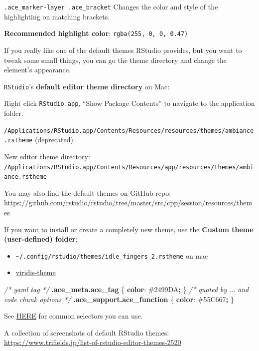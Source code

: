 \documentclass[
  a4paper,
  twoside,
  openright]{book}
\newenvironment{Shaded}{\begin{snugshade}}{\end{snugshade}}
\newcommand{\CharTok}[1]{\textcolor[rgb]{0.31,0.60,0.02}{#1}}
\newcommand{\CommentTok}[1]{\textcolor[rgb]{0.56,0.35,0.01}{\textit{#1}}}
\newcommand{\ConstantTok}[1]{\textcolor[rgb]{0.56,0.35,0.01}{#1}}
\newcommand{\FunctionTok}[1]{\textcolor[rgb]{0.13,0.29,0.53}{\textbf{#1}}}
\newcommand{\KeywordTok}[1]{\textcolor[rgb]{0.13,0.29,0.53}{\textbf{#1}}}
\newcommand{\NormalTok}[1]{#1}
\newcommand{\OperatorTok}[1]{\textcolor[rgb]{0.81,0.36,0.00}{\textbf{#1}}}
\providecommand{\tightlist}{%
  \setlength{\itemsep}{0pt}\setlength{\parskip}{0pt}}
\theoremstyle{definition}
\theoremstyle{definition}
\theoremstyle{definition}
\theoremstyle{definition}
\theoremstyle{remark}
\begin{document}
\texttt{.ace\_marker-layer\ .ace\_bracket} Changes the color and style of the highlighting on matching brackets.

\textbf{Recommended highlight color}: \texttt{rgba(255,\ 0,\ 0,\ 0.47)}

If you really like one of the default themes RStudio provides, but you want to tweak some small things, you can go the theme directory and change the element's appearance.

\texttt{RStudio}'s \textbf{default editor theme directory} on Mac:

Right click \texttt{RStudio.app}, ``Show Package Contents'' to navigate to the application folder.

\texttt{/Applications/RStudio.app/Contents/Resources/resources/themes/ambiance.rstheme} (deprecated)

New editor theme directory: \texttt{/Applications/RStudio.app/Contents/Resources/app/resources/themes/ambiance.rstheme}

You may also find the default themes on GitHub repo: \url{https://github.com/rstudio/rstudio/tree/master/src/cpp/session/resources/themes}

If you want to install or create a completely new theme, use the \textbf{Custom theme (user-defined) folder}:

\begin{itemize}
\tightlist
\item
  \texttt{\textasciitilde{}/.config/rstudio/themes/idle\_fingers\_2.rstheme} on mac
\item
  \href{https://github.com/z3tt/viridis-theme/blob/main/viridis.rstheme}{viridis-theme}
\end{itemize}

\begin{Shaded}
\begin{Highlighting}[]
\CommentTok{/* yaml tag */}
\FunctionTok{.ace\_meta.ace\_tag}\NormalTok{ \{}
  \KeywordTok{color}\CharTok{:} \ConstantTok{\#2499DA}\OperatorTok{;}
\NormalTok{\}}
\CommentTok{/* quoted by $...$ and code chunk options */}
\FunctionTok{.ace\_support.ace\_function}\NormalTok{ \{}
  \KeywordTok{color}\CharTok{:} \ConstantTok{\#55C667}\OperatorTok{;}
\NormalTok{\}}
\end{Highlighting}
\end{Shaded}

See \href{https://docs.posit.co/ide/user/ide/guide/ui/appearance.html\#creating-an-rstheme}{HERE} for common selectors you can use.

A collection of screenshots of default RStudio themes: \url{https://www.trifields.jp/list-of-rstudio-editor-themes-2520}
\end{document}

